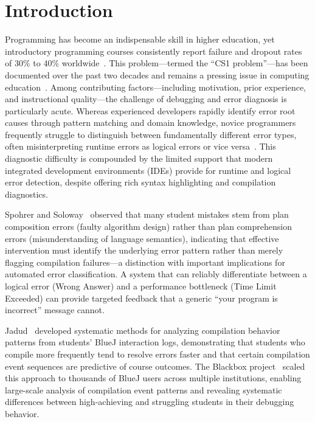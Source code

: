 \documentclass[acmsmall]{acmart}
\begin{document}
\maketitle

\section{Introduction}

Programming has become an indispensable skill in higher education, yet
introductory programming courses consistently report failure and dropout rates
of 30\% to 40\% worldwide~\cite{bennedsen2007failure,watson2018failure}. This
problem---termed the ``CS1 problem''---has been
documented over the past two decades and remains a pressing
issue in computing education~\cite{pears2007survey}. Among contributing
factors---including motivation, prior experience,
and instructional quality---the challenge of debugging and error diagnosis is
particularly acute. Whereas experienced developers rapidly identify
error root causes through pattern matching and domain knowledge, novice
programmers frequently struggle to distinguish between fundamentally different
error types, often misinterpreting runtime errors as logical errors or vice
versa~\cite{mccauley2008evidence}. This diagnostic difficulty is compounded by
the limited support that modern integrated development environments (IDEs)
provide for runtime and logical error detection, despite offering rich
syntax highlighting and compilation diagnostics.

Spohrer and Soloway~\cite{spohrer1986novice} observed that many student
mistakes stem from plan composition errors (faulty algorithm design) rather
than plan comprehension errors (misunderstanding of language semantics),
indicating that effective intervention must identify the underlying
error pattern rather than merely flagging compilation failures---a distinction
with important implications for automated error classification.
A system that can reliably differentiate between a logical error (Wrong
Answer) and a performance bottleneck (Time Limit Exceeded) can provide
targeted feedback that a generic ``your program is incorrect'' message cannot.

Jadud~\cite{jadud2006methods} developed systematic methods
for analyzing compilation behavior patterns from students' BlueJ interaction
logs, demonstrating that students who compile more frequently tend to resolve
errors faster and that certain compilation event sequences are predictive of
course outcomes. The Blackbox project~\cite{brown2014blackbox} scaled this
approach to thousands of BlueJ users across multiple institutions, enabling
large-scale analysis of compilation event patterns and revealing systematic
differences between high-achieving and struggling students in their debugging
behavior.
\end{document}
